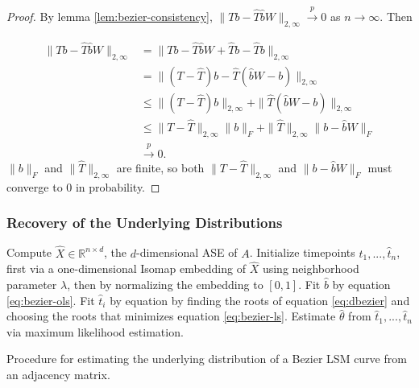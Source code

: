 \documentclass[12pt]{article}
\begin{document}
\begin{proof}
By lemma \ref{lem:bezier-consistency}, $\|T b - \hat{T} \hat{b} W\|_{2,\infty} \stackrel{p}{\to} 0$ as $n \to \infty$. 
Then 

$$
\begin{aligned}
\|T b - \hat{T} \hat{b} W\|_{2,\infty} & = \|T b - \hat{T} \hat{b} W + \hat{T} b - \hat{T} b\|_{2,\infty} \\
& = \|(T - \hat{T}) b - \hat{T} (\hat{b} W - b)\|_{2,\infty} \\
& \leq \|(T - \hat{T}) b\|_{2,\infty} + \|\hat{T} (\hat{b} W - b)\|_{2,\infty} \\
& \leq \|T - \hat{T}\|_{2,\infty} \|b\|_F + \|\hat{T}\|_{2,\infty} \|b - \hat{b} W\|_F \\
& \stackrel{p}{\to} 0.
\end{aligned}
$$
$\|b\|_F$ and $\|\hat{T}\|_{2,\infty}$ are finite, so both $\|T - \hat{T}\|_{2,\infty}$ and $\|b - \hat{b} W\|_F$ must converge to $0$ in probability. 
\end{proof}

\hypertarget{recovery-of-the-underlying-distributions}{%
\subsubsection{Recovery of the Underlying
Distributions}\label{recovery-of-the-underlying-distributions}}

\begin{algorithm}[H]
\label{alg:bezier-param-fit}
\DontPrintSemicolon
\SetAlgoLined
{}
Compute $\hat{X} \in \mathbb{R}^{n \times d}$, the $d$-dimensional ASE of $A$.\;
Initialize timepoints $\hat{t}_1, ..., \hat{t}_n$, first via a one-dimensional Isomap embedding of $\hat{X}$ using neighborhood parameter $\lambda$, then by normalizing the embedding to $[0, 1]$.\;
 {
  Fit $\hat{b}$ by equation \ref{eq:bezier-ols}.\;
   {
    Fit $\hat{t}_i$ by equation by finding the roots of equation \ref{eq:dbezier} and choosing the roots that minimizes equation \ref{eq:bezier-ls}.\;
  }
}
Estimate $\hat{\theta}$ from $\hat{t}_1, ..., \hat{t}_n$ via maximum likelihood estimation.\; 
\caption{Procedure for estimating the underlying distribution of a Bezier LSM curve from an adjacency matrix.}
\end{algorithm}
\end{document}
